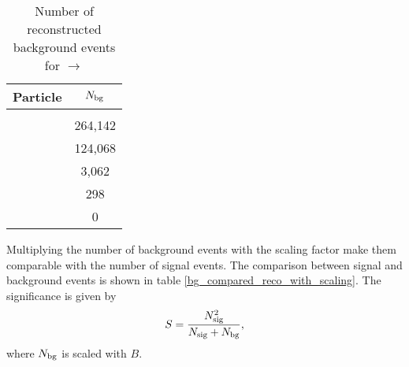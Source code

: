 \begin{table}
	\centering
	\caption{Number of reconstructed background events for \pbarpSystem $\rightarrow$ \excitedcascade \anticascade }
	\label{tab:bg_reco_without_scaling}
	\begin{tabular}{lc}
		\hline
		Particle & $N_{\textnormal{bg}}$ \\
		\hline
		\hline
		&\\
		\lam & 264,142\\
		\alam & 124,068\\
		\anticascade & 3,062\\
		\excitedcascade & 298\\
		\excitedcascade \anticascade & 0\\
		\hline
		 
		  
	\end{tabular}
\end{table}
Multiplying the number of background events with the scaling factor make them comparable with the number of signal events.
The comparison between signal and background events is shown in table \ref{bg_compared_reco_with_scaling}.
The significance is given by
\begin{equation}
	S = \frac{N^{2}_{\textnormal{sig}}}{N_{\textnormal{sig}}+N_{\textnormal{bg}}},
	\label{eq:significance}
\end{equation}
where $N_{\textnormal{bg}}$ is scaled with $B$.

